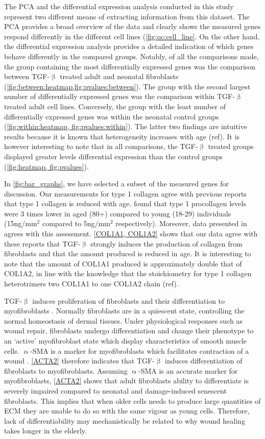 \documentclass[alpha-refs]{wiley-article}
\newcommand{\tgf}{TGF-$\upbeta$}
\newcommand{\sma}{$\upalpha$-SMA}
\begin{document}
The PCA and the differential expression analysis conducted in this study represent two different means of extracting information from this dataset. The PCA provides a broad overview of the data and clearly shows the measured genes respond differently in the different cell lines (\cref{fig:qc:cell_line}. On the other hand, the differential expression analysis provides a detailed indication of which genes behave differently in the compared groups. Notably, of all the comparisons made, the group containing the most differentially expressed genes was the comparison between \tgf{} treated adult and neonatal fibroblasts (\cref{fig:between:heatmap,fig:pvalues:between}). The group with the second largest number of differentially expressed genes was the comparison within \tgf{} treated adult cell lines. Conversely, the group with the least number of differentially expressed genes was within the neonatal control groups (\cref{fig:within:heatmap, fig:pvalues:within}). The latter two findings are intuitive results because it is known that heterogeneity increases with age (ref). It is however interesting to note that in all comparisons, the \tgf{} treated groups displayed greater levels differential expression than the control groups (\cref{fig:heatmap, fig:pvalues}). 

In \cref{fig:bar_graphs}, we have selected a subset of the measured genes for discussion. Our measurements for type 1 collagen agree with previous reports that type 1 collagen is reduced with age. \cite{Varani2006} found that type 1 procollagen levels were 3 times lower in aged (80+) compared to young (18-29) individuals (15ng/mm$^2$ compared to 5ng/mm$^2$ respectively). Moreover, data presented in \cite{Quan2010} agrees with this assessment. \cref{COL1A1, COL1A2} shows that our data agree with these reports that \tgf{} strongly induces the production of collagen from fibroblasts and that the amount produced is reduced in age. It is interesting to note that the amount of COL1A1 produced is approximately double that of COL1A2, in line with the knowledge that the stoichiometry for type 1 collagen heterotrimers two COL1A1 to one COL1A2 chain (ref). 

\tgf{} induces proliferation of fibroblasts and their differentiation to myofibroblasts \citep{Liu2016, Negmadjanov2015}. Normally fibroblasts are in a quiescent state, controlling the normal homeostasis of dermal tissues. Under physiological responses such as wound repair, fibroblasts undergo differentiation and change their phenotype to an `active' myofibroblast state which display characteristics of smooth muscle cells. \sma{} is a marker for myofibroblasts \citep{Zanotti2010, Evans2003} which facilitates contraction of a wound \citep{Darby2007}. \cref{ACTA2} therefore indicates that \tgf{} induces differentiation of fibroblasts to myofibroblasts. Assuming \sma{} is an accurate marker for myofibroblasts, \cref{ACTA2} shows that adult fibroblasts ability to differentiate is severely impaired compared to neonatal and damage-induced senescent fibroblasts. This implies that when older cells needs to produce large quantities of ECM they are unable to do so with the same vigour as young cells. Therefore, lack of differentiability may mechanistically be related to why wound healing takes longer in the elderly. 
\end{document}
